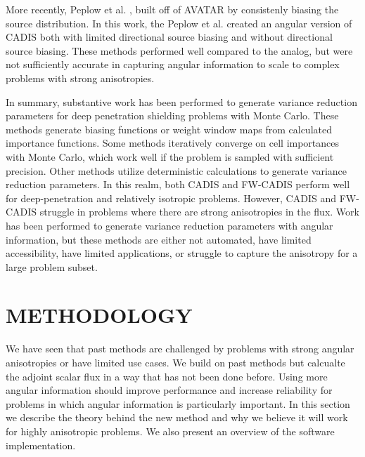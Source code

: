 \documentclass[12pt]{article}
\begin{document}
More recently, Peplow et al. \cite{peplow_consistent_2012}, built off of AVATAR by consistenly biasing the source distribution. In this work, the Peplow et al. created an angular version of CADIS both with limited directional source biasing and without directional source biasing. These methods performed well compared to the analog, but were not sufficiently accurate in capturing angular information to scale to complex problems with strong anisotropies. 

In summary, substantive work has been performed to generate variance reduction parameters for deep penetration shielding problems with Monte Carlo. These methods generate biasing functions or weight window maps from calculated importance functions. Some methods iteratively converge on cell importances with Monte Carlo, which work well if the problem is sampled with sufficient precision. Other methods utilize deterministic calculations to generate variance reduction parameters. In this realm, both CADIS and FW-CADIS perform well for deep-penetration and relatively isotropic problems. However, CADIS and FW-CADIS struggle in problems where there are strong anisotropies in the flux. Work has been performed to generate variance reduction parameters with angular information, but these methods are either not automated, have limited accessibility, have limited applications, or struggle to capture the anisotropy for a large problem subset. 


%
\section{METHODOLOGY}
\label{sect::methodology}

We have seen that past methods are challenged by problems with strong angular anisotropies or have limited use cases.
We build on past methods but calcualte the adjoint scalar flux in a way that has not been done before.
Using more angular information should improve performance and increase reliability for problems in which angular information is particularly important. 
In this section we describe the theory behind the new method and why we believe it will work for highly anisotropic problems. We also present an overview of the software implementation.  

%
\end{document}
